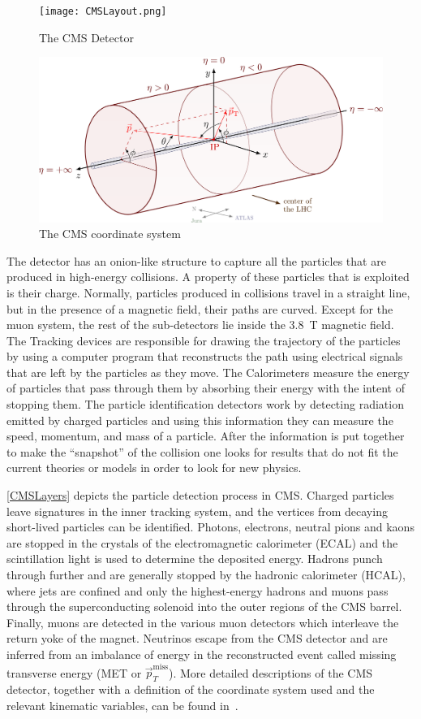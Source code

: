 \begin{figure}
	\centering
	\texttt{[image: CMSLayout.png]}
	\caption{The CMS Detector \label{CMSLayout}}
\end{figure}
\begin{figure}
	\centering
	\includegraphics[width=.8\linewidth]{Images/CMS Coordinate.png}
	\caption{The CMS coordinate system}
	\label{fig:CMSCoord}
\end{figure}
The detector has an onion-like structure to capture all the particles that are produced in high-energy collisions.
A property of these particles that is exploited is their charge. Normally, particles produced in collisions travel in a straight line, but in the presence of a magnetic field, their paths are curved.
Except for the muon system, the rest of the sub-detectors lie inside the 3.8~\unit{T} magnetic field.
The Tracking devices are responsible for drawing the trajectory of the particles by using a computer program that reconstructs the path using electrical signals that are left by the particles as they move. The Calorimeters measure the energy of particles that pass through them by absorbing their energy with the intent of stopping them.
The particle identification detectors work by detecting radiation emitted by charged particles and using this information they can measure the speed, momentum, and mass of a particle. After the information is put together to make the “snapshot” of the collision one looks for results that do not fit the current theories or models in order to look for new physics.

\autoref{CMSLayers} depicts the particle detection process in CMS. Charged particles leave signatures in the inner tracking system, and the vertices from decaying short-lived particles can be identified. Photons, electrons, neutral pions and kaons are stopped in the crystals of the electromagnetic calorimeter (ECAL) and the scintillation light is used to determine the deposited energy. Hadrons punch through further and are generally stopped by the hadronic calorimeter (HCAL), where jets are confined and only the highest-energy hadrons and muons pass through the superconducting solenoid into the outer regions of the CMS barrel. Finally, muons are detected in the various muon detectors which interleave the return yoke of the magnet. Neutrinos escape from the CMS detector and are inferred from an imbalance of energy in the reconstructed event called missing transverse energy (MET or $\vec{p}_T^{\text{miss}}$).
More detailed descriptions of the CMS detector, together with a definition of the coordinate system used and the relevant kinematic variables, can be found in~\cite{CMS:2008xjf,CMS:2023gfb}.

